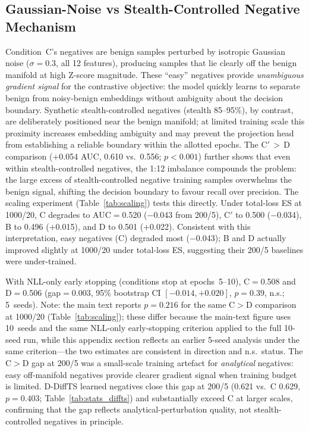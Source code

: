 \subsection{Gaussian-Noise vs Stealth-Controlled Negative Mechanism}
\label{app:gaussian_mechanism}

Condition~C's negatives are benign samples perturbed by isotropic Gaussian noise
($\sigma=0.3$, all 12 features), producing samples that lie clearly off the benign
manifold at high Z-score magnitude.
These ``easy'' negatives provide \emph{unambiguous gradient signal} for the
contrastive objective: the model quickly learns to separate benign from noisy-benign
embeddings without ambiguity about the decision boundary.
Synthetic stealth-controlled negatives (stealth 85--95\%), by contrast, are deliberately
positioned near the benign manifold; at limited training scale this proximity
increases embedding ambiguity and may prevent the projection head from
establishing a reliable boundary within the allotted epochs.
The C$'$\,$>$\,D comparison ($+$0.054 AUC, 0.610 vs.\ 0.556; $p{<}0.001$) further shows that even
within stealth-controlled negatives, the 1:12 imbalance compounds the problem: the large excess
of stealth-controlled negative training samples overwhelms the benign signal, shifting the
decision boundary to favour recall over precision.
The scaling experiment (Table~\ref{tab:scaling}) tests this directly.
Under total-loss ES at 1000/20, C degrades to AUC$=$0.520 ($-$0.043 from 200/5),
C$'$ to 0.500 ($-$0.034), B to 0.496 ($+$0.015), and D to 0.501 ($+$0.022).
Consistent with this interpretation,
easy negatives (C) degraded most ($-$0.043); B and D actually improved slightly
at 1000/20 under total-loss ES, suggesting their 200/5 baselines were under-trained.

With NLL-only early stopping (conditions stop at epochs~5--10), C$=$0.508 and
D$=$0.506 (gap$=$0.003, 95\% bootstrap CI $[-0.014, +0.020]$,
$p{=}0.39$, n.s.; 5~seeds).
Note: the main text reports $p{=}0.216$ for the same C$>$D comparison at
1000/20 (Table~\ref{tab:scaling}); these differ because the main-text figure
uses 10~seeds and the same NLL-only early-stopping criterion applied to the
full 10-seed run, while this appendix section reflects an earlier 5-seed
analysis under the same criterion---the two estimates are consistent in
direction and n.s.\ status.
The C$>$D gap at 200/5 was a small-scale training artefact for
\emph{analytical} negatives: easy off-manifold negatives provide clearer
gradient signal when training budget is limited.
D-DiffTS learned negatives close this gap at 200/5 (0.621 vs.\ C 0.629,
$p{=}0.403$; Table~\ref{tab:stats_diffts}) and substantially exceed C at
larger scales, confirming that the gap reflects analytical-perturbation
quality, not stealth-controlled negatives in principle.

